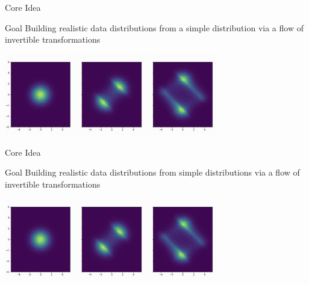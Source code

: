 \documentclass[aspectratio=169,xcolor=dvipsnames]{beamer}
\begin{document}
\begin{frame}{Core Idea}
  \begin{block}{Goal}
    Building realistic data distributions from a simple distribution via a flow of invertible transformations
  \end{block}
  \vspace{0.3}
  \begin{center}
    \includegraphics[width=0.7\textwidth]{pictures/nf_illustration}
  \end{center}
\end{frame} 

\begin{frame}{Core Idea}
  \begin{block}{Goal}
    Building realistic data distributions from simple distributions via a flow of invertible transformations
  \end{block}
  \vspace{0.3}
  \begin{center}
    \includegraphics[width=0.7\textwidth]{pictures/nf_illustration}
  \end{center}
\end{frame}
\end{document}
